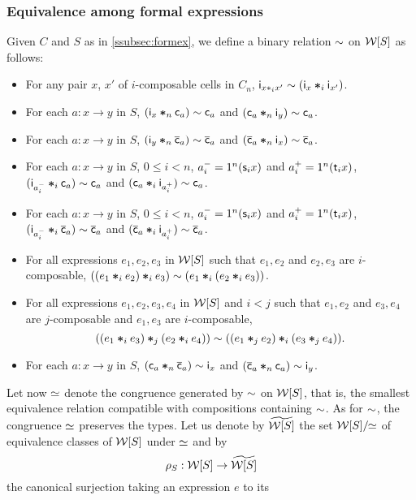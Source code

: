  \subsubsection{Equivalence among formal
   expressions}\label{ssubsec:eqform}
Given $C$ and $S$ as in \ref{ssubsec:formex},  we define a
binary relation $\sim$ on $\mathcal{W}[S]$ as follows:
\begin{itemize}
\item For any pair $x$, $x'$ of $i$-composable cells in $C_n$,
  $\mathsf{i}_{x\ast_{i} x'}\sim (\mathsf{i}_{x}\bm{\ast}_{i}\mathsf{i}_{x'})$.
\item For each $a:x\to y$ in $S$, $(\mathsf{i}_{x}\bm{\ast}_{n}\mathsf{c}_{a})\sim
  \mathsf{c}_{a}$ and $(\mathsf{c}_{a}\bm{\ast}_{n} \mathsf{i}_{y})\sim \mathsf{c}_{a}$.
 \item For each $a:x\to y$ in $S$, $(\mathsf{i}_{y}\bm{\ast}_{n}\overline{\mathsf{c}}_{a})\sim
   \overline{\mathsf{c}}_{a}$ and $(\overline{\mathsf{c}}_{a}\bm{\ast}_{n} \mathsf{i}_{x})\sim \overline{\mathsf{c}}_{a}$.
\item For each $a:x\to y$ in $S$, $0\leq i< n$, $a_i^{-}=1^{n}(\mathsf{s}_{i}
  x)$ and $a_i^{+}=1^{n}(\mathsf{t}_{i} x)$, $(\mathsf{i}_{a_i^{-}}\bm{\ast}_{i}\mathsf{c}_{a})\sim
  \mathsf{c}_{a}$ and $(\mathsf{c}_{a}\bm{\ast}_{i} \mathsf{i}_{a_i^+})\sim \mathsf{c}_{a}$.
\item For each $a:x\to y$ in $S$, $0\leq i< n$, $a_i^{-}=1^{n}(\mathsf{s}_{i}
  x)$ and $a_i^{+}=1^{n}(\mathsf{t}_{i} x)$, $(\mathsf{i}_{a_i^{-}}\bm{\ast}_{i}\overline{\mathsf{c}}_{a})\sim
  \overline{\mathsf{c}}_{a}$ and $(\overline{\mathsf{c}}_{a}\bm{\ast}_{i} \mathsf{i}_{a_i^+})\sim \overline{\mathsf{c}}_{a}$.  
 \item For all expressions $e_1,e_2,e_3$ in $\mathcal{W}[S]$ such that $e_1,e_2$ and
   $e_2,e_3$ are $i$-composable, $((e_1\bm{\ast}_{i} e_2)\bm{\ast}_{i} e_3)\sim
   (e_1\bm{\ast}_{i}(e_2\bm{\ast}_{i} e_3))$.
 \item For all expressions $e_1,e_2,e_3,e_4$ in $\mathcal{W}[S]$ and $i<j$
   such that $e_1,e_2$ and $e_3,e_4$ are
   $j$-composable and $e_1,e_3$ are $i$-composable,
   \[
     ((e_1\bm{\ast}_{i} e_3)\bm{\ast}_{j} (e_2\bm{\ast}_{i} e_4))\sim ((e_1\bm{\ast}_{j}
     e_2)\bm{\ast}_{i} (e_3\bm{\ast}_{j} e_4)).
   \]
  \item For each $a:x\to y$ in $S$, $(\mathsf{c}_{a}\bm{\ast}_{n}\overline{\mathsf{c}}_{a})\sim
    \mathsf{i}_{x}$ and $(\overline{\mathsf{c}}_{a}\bm{\ast}_{n}\mathsf{c}_{a})\sim \mathsf{i}_{y}$. 
  \end{itemize}
  Let now $\simeq$ denote the congruence generated by
  $\sim$ on $\mathcal{W}[S]$, that is, the smallest equivalence relation
  compatible with compositions containing $\sim$. As for $\sim$, the
  congruence $\simeq$ preserves the types. Let us denote by $\widetilde{\mathcal{W}[S]}$
  the set $\mathcal{W}[S]/\!\!\simeq$ of equivalence classes of $\mathcal{W}[S]$ under
  $\simeq$ and by
  \[\rho_{S}: \mathcal{W}[S]\to \widetilde{\mathcal{W}[S]}\]
  the canonical surjection taking an expression $e$ to its
